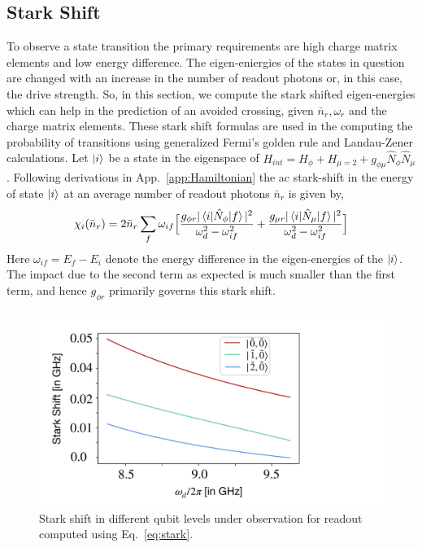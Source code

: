 \documentclass[prx,showpacs,notitlepage,twocolumn,superscriptaddress,nofootinbib,preprintnumbers,floatfix]{revtex4-2}
\begin{document}
\subsection{Stark Shift}\label{app:stark-shift}
To observe a state transition the primary requirements are high charge matrix elements and low energy difference. The eigen-eniergies of the states in question are changed with an increase in the number of readout photons or, in this case, the drive strength. So, in this section, we compute the stark shifted eigen-energies which can help in the prediction of an avoided crossing, given $\bar n_r, \omega_r$ and the charge matrix elements. These stark shift formulas are used in the computing the probability of transitions using generalized Fermi's golden rule and Landau-Zener calculations. Let $\ket{i}$ be a state in the eigenspace of $H_{int}=H_\phi+H_{\mu=2}+g_{\phi\mu}\hat N_\phi\hat N_\mu$. Following derivations in App.~\ref{app:Hamiltonian} the ac stark-shift in the energy of state $\ket{i}$ at an average number of readout photons $\bar n_r$ is given by,
\begin{align}
    \chi_i(\bar n_r)=2\bar n_r\sum_{f}\omega_{if}\Big[\frac{g_{\phi r}|\braket{i|\hat N_\phi|f}|^2}{\omega_d^2-\omega_{if}^2}+\frac{g_{\mu r}|\braket{i|\hat N_\mu|f}|^2}{\omega_d^2-\omega_{if}^2}\Big]\label{eq:stark}
\end{align}
 Here $\omega_{if}=E_f-E_i$ denote the energy difference in the eigen-energies of the $\ket{i}$. The impact due to the second term as expected is much smaller than the first term, and hence $g_{\phi r}$ primarily governs this stark shift.
 \begin{figure}
     \centering
     \includegraphics[width=\linewidth]{Figures/Stark-shift.pdf}
     \caption{Stark shift in different qubit levels under observation for readout computed using Eq.~\ref{eq:stark}.}
     \label{fig:stark-shift}
 \end{figure}
\end{document}

